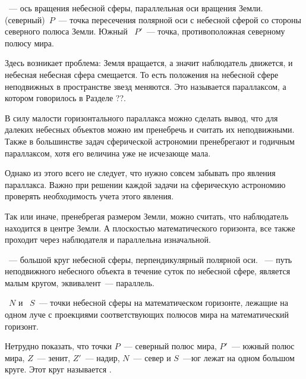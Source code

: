 ~--- ось вращения небесной сферы, параллельная оси вращения Земли.  (северный)~$P$~--- точка пересечения полярной оси с небесной сферой со стороны северного полюса Земли. Южный ~$P'$~--- точка, противоположная северному полюсу мира.

Здесь возникает проблема: Земля вращается, а значит наблюдатель движется, и небесная небесная сфера смещается. То есть положения на небесной сфере неподвижных в пространстве звезд меняются. Это называется параллаксом, а котором говорилось в Разделе ??. 

В силу малости горизонтального параллакса можно сделать вывод, что для далеких небесных объектов можно им пренебречь и считать их неподвижными. Также в большинстве задач сферической астрономии пренебрегают и годичным параллаксом, хотя его величина уже не исчезающе мала. 

Однако из этого всего не следует, что нужно совсем забывать про явления параллакса. Важно при решении каждой задачи на сферическую астрономию проверять необходимость учета этого явления.

Так или иначе, пренебрегая размером Земли, можно считать, что наблюдатель находится в центре Земли. А плоскостью математического горизонта, все также проходит через наблюдателя и параллельна изначальной.

~--- большой круг небесной сферы, перпендикулярный полярной оси. ~--- путь неподвижного небесного объекта в течение суток по небесной сфере, является малым кругом, эквивалент~--- параллель.

~$N$ и ~$S$~--- точки небесной сферы на математическом горизонте, лежащие на одном луче с проекциями соответствующих полюсов мира на математический горизонт.

Нетрудно показать, что точки $P$~--- северный полюс мира, $P'$~--- южный полюс мира, $Z$~--- зенит, $Z'$~--- надир, $N$~--- север и $S$~---юг лежат на одном большом круге. Этот круг называется .









